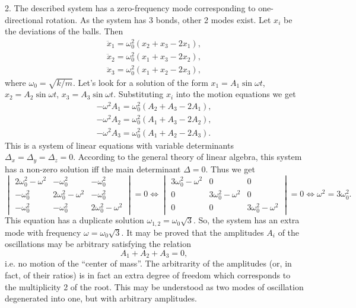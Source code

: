 \documentclass[12pt,a4paper,pdflatex]{disser}
\begin{document}
2. The described system has a zero-frequency mode corresponding to one-directional rotation. As the system has 3 bonds, other 2 modes exist. Let $x_i$ be the deviations of the balls. Then
\begin{gather*}
  \ddot{x}_1=\omega_0^2 \left(x_2+x_3-2x_1\right),\\
  \ddot{x}_2=\omega_0^2 \left(x_1+x_3-2x_2\right),\\
  \ddot{x}_3=\omega_0^2 \left(x_1+x_2-2x_3\right),
\end{gather*}
where $\omega_0=\sqrt{k/m}$. Let's look for a solution of the form $x_1=A_1 \sin\omega t$, $x_2=A_2\sin\omega t$, $x_3=A_3\sin\omega t$. Substituting $x_i$ into the motion equations we get
\begin{gather*}
  -\omega^2 A_1=\omega_0^2 \left(A_2+A_3-2A_1\right),\\
  -\omega^2 A_2=\omega_0^2 \left(A_1+A_3-2A_2\right),\\
  -\omega^2 A_3=\omega_0^2 \left(A_1+A_2-2A_3\right).
\end{gather*}
This is a system of linear equations with variable determinants $\Delta_x=\Delta_y=\Delta_z=0$. According to the general theory of linear algebra, this system has a non-zero solution iff the main determinant $\Delta=0$. Thus we get
$$
  \begin{vmatrix}
  2\omega_0^2-\omega^2 & -\omega_0^2 & -\omega_0^2\\
  -\omega_0^2 & 2\omega_0^2-\omega^2 & -\omega_0^2\\
  -\omega_0^2 & -\omega_0^2 & 2\omega_0^2-\omega^2
  \end{vmatrix}=0\Leftrightarrow
  \begin{vmatrix}
  3\omega_0^2-\omega^2 & 0 & 0\\
  0 & 3\omega_0^2-\omega^2 & 0\\
  0 & 0 & 3\omega_0^2-\omega^2
  \end{vmatrix}=0\Leftrightarrow \omega^2=3\omega_0^2.
$$
This equation has a duplicate solution $\omega_{1,2}=\omega_0 \sqrt{3}$. So, the system has an extra mode with frequency $\omega=\omega_0 \sqrt{3}$. It may be proved that the amplitudes $A_i$ of the oscillations may be arbitrary satisfying the relation
$$
  A_1+A_2+A_3=0,
$$
i.e. no motion of the ``center of mass''. The arbitrarity of the amplitudes (or, in fact, of their ratios) is in fact an extra degree of freedom which corresponds to the multiplicity 2 of the root. This may be understood as two modes of oscillation degenerated into one, but with arbitrary amplitudes.
\end{document}
